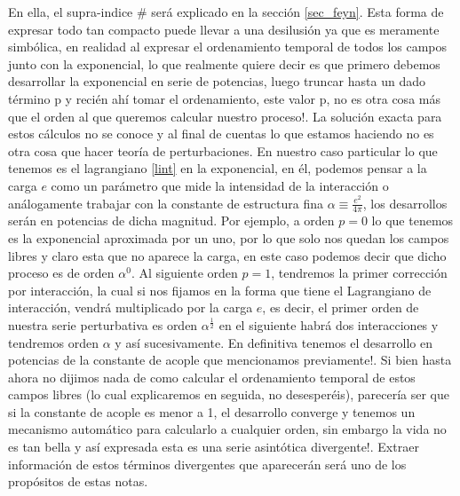 \documentclass[tickz]{article}
\numberwithin{equation}{section}
\begin{document}

En ella, el supra-indice $ \# $ será explicado en la sección \ref{sec_feyn}. Esta forma de expresar todo tan compacto puede llevar a una desilusión ya que es meramente simbólica, en realidad al expresar
el ordenamiento temporal de todos los campos junto con la exponencial,
lo que realmente quiere decir es que primero debemos desarrollar la
exponencial en serie de potencias, luego truncar hasta un dado término
p y recién ahí tomar el ordenamiento, este valor p, no es otra cosa más que el orden al que queremos
calcular nuestro proceso!. La solución exacta para estos cálculos no se conoce y al final de cuentas lo que estamos haciendo no es otra cosa que hacer teoría de perturbaciones. En nuestro caso particular lo que tenemos es el lagrangiano \ref{lint} en la exponencial, en él, podemos pensar a la carga $ e $ como un parámetro que mide la intensidad de la interacción o análogamente trabajar con la constante de estructura fina $\alpha\equiv$$\frac{e^{2}}{4\pi}$, los desarrollos serán en potencias de dicha magnitud. Por ejemplo, a orden $p=0$ lo que tenemos es la exponencial aproximada por un uno, por lo que solo nos quedan los campos libres y claro esta que no aparece la carga, en este caso podemos decir que dicho proceso es de orden $\alpha^{0}$. Al
siguiente orden $p=1$, tendremos la primer corrección por interacción,
la cual si nos fijamos en la forma que tiene el Lagrangiano de interacción, vendrá multiplicado
por la carga $ e $, es decir, el primer orden de nuestra serie perturbativa
es orden $\alpha^{\frac{1}{2}}$ en el siguiente habrá dos interacciones
y tendremos orden $\alpha$ y así sucesivamente. En definitiva tenemos
el desarrollo en potencias de la constante de acople que mencionamos
previamente!. Si bien hasta ahora no dijimos nada de como calcular
el ordenamiento temporal de estos campos libres (lo cual explicaremos
en seguida, no desesperéis), parecería ser que si la constante de
acople es menor a 1, el desarrollo converge y tenemos un mecanismo
automático para calcularlo a cualquier orden, sin embargo la vida
no es tan bella y así expresada esta es una serie asintótica divergente!.
Extraer información de estos términos divergentes que aparecerán será
uno de los propósitos de estas notas. 
\end{document}
